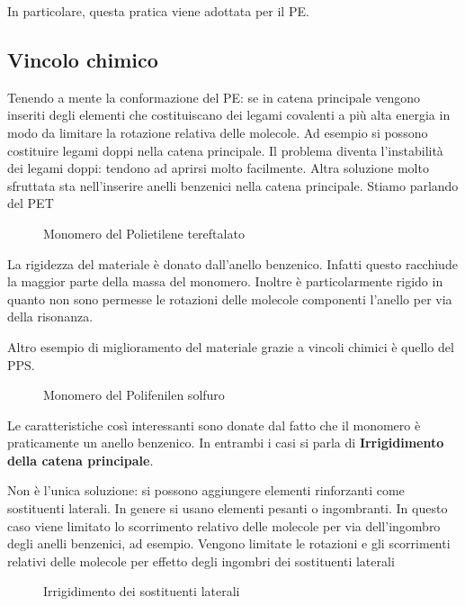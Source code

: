 In particolare, questa pratica viene adottata per il \ac{PE}.

\subsection{Vincolo chimico}
Tenendo a mente la conformazione del \ac{PE}: se in catena principale vengono inseriti degli elementi che costituiscano dei legami covalenti a più alta energia in modo da limitare la rotazione relativa delle molecole.
Ad esempio si possono costituire legami doppi nella catena principale.
Il problema diventa l'instabilità dei legami doppi: tendono ad aprirsi molto facilmente.
Altra soluzione molto sfruttata sta nell'inserire anelli benzenici nella catena principale.
Stiamo parlando del \ac{PET}

\begin{figure}
\centering
{}
\caption{Monomero del Polietilene tereftalato}
\label{fig:PET}
\end{figure}

La rigidezza del materiale è donato dall'anello benzenico. Infatti questo racchiude la maggior parte della massa del monomero. Inoltre è particolarmente rigido in quanto non sono permesse le rotazioni delle molecole componenti l'anello per via della risonanza.

Altro esempio di miglioramento del materiale grazie a vincoli chimici è quello del \ac{PPS}.
\begin{figure}
\centering
{}
\caption{Monomero del Polifenilen solfuro}
\label{fig:PPS}
\end{figure}
Le caratteristiche così interessanti sono donate dal fatto che il monomero è praticamente un anello benzenico.
In entrambi i casi si parla di \textbf{Irrigidimento della catena principale}.

Non è l'unica soluzione: si possono aggiungere elementi rinforzanti come sostituenti laterali. In genere si usano elementi pesanti o ingombranti.
In questo caso viene limitato lo scorrimento relativo delle molecole per via dell'ingombro degli anelli benzenici, ad esempio.
Vengono limitate le rotazioni e gli scorrimenti relativi delle molecole per effetto degli ingombri dei sostituenti laterali

\begin{figure}
\centering
{}
\caption{Irrigidimento dei sostituenti laterali}
\label{fig:IrrigidimentoLaterali}
\end{figure}

